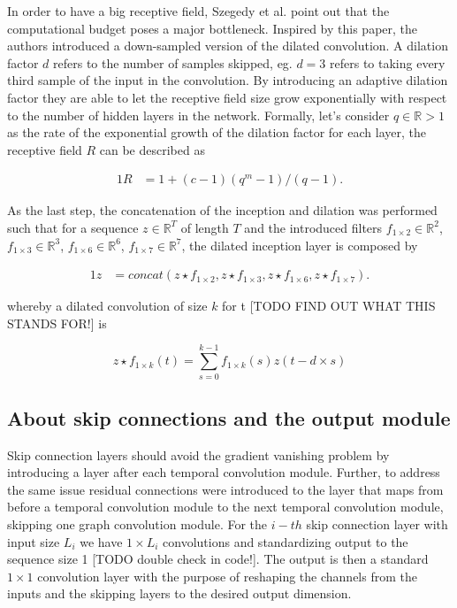 \documentclass[letterpaper,twocolumn,12pt]{article}
\begin{document}
    In order to have a big receptive field, Szegedy et al. \cite{Szegedy_2015_CVPR} point out that the computational budget poses a major bottleneck.
    Inspired by this paper, the authors introduced a down-sampled version of the dilated convolution.
    A dilation factor $d$ refers to the number of samples skipped, eg. $d=3$ refers to taking every third sample of the input in the convolution.
    By introducing an adaptive dilation factor they are able to let the receptive field size grow exponentially with respect to the number of hidden layers in the network.
    Formally, let's consider $q \in \mathbb{R}>1$ as the rate of the exponential growth of the dilation factor for each layer,
    the receptive field $R$ can be described as

        \begin{alignat}{1}
            R &= 1 + (c-1)(q^m-1)/(q-1).  \label{eq:adaptive_receptive_field}
        \end{alignat}


    As the last step, the concatenation of the inception and dilation was performed such that for a sequence $z \in \mathbb{R}^T$ of length $T$ and the introduced filters
    $f_{1 \times 2} \in \mathbb{R}^2$,
    $f_{1 \times 3} \in \mathbb{R}^3$,
    $f_{1 \times 6} \in \mathbb{R}^6$,
    $f_{1 \times 7} \in \mathbb{R}^7$,
    the dilated inception layer is composed by

    \begin{alignat}{1}
        z &= concat(
        z \star f_{1 \times 2},
        z \star f_{1 \times 3},
        z \star f_{1 \times 6},
        z \star f_{1 \times 7}
        ).
        \label{eq:dilated_inception_layer_wrt_z}
    \end{alignat}

    whereby a dilated convolution of size $k$ for t [TODO FIND OUT WHAT THIS STANDS FOR!] is

    \begin{equation}
        z \star f_{1 \times k}(t) = \sum_{s=0}^{k-1} f_{1 \times k}(s)z(t-d \times s)
    \end{equation}


    \subsection{About skip connections and the output module}
    Skip connection layers should avoid the gradient vanishing problem by introducing a layer after each temporal convolution module.
    Further, to address the same issue residual connections were introduced to the layer that maps from before a temporal convolution module to the next temporal convolution module, skipping one graph convolution module.
    For the $i-th$ skip connection layer with input size $L_i$ we have  $1 \times L_i$ convolutions and standardizing output to the sequence size 1 [TODO double check in code!].
    The output is then a standard $ 1 \times 1$ convolution layer with the purpose of reshaping the channels from the inputs and the skipping layers to the desired output dimension.
\end{document}
